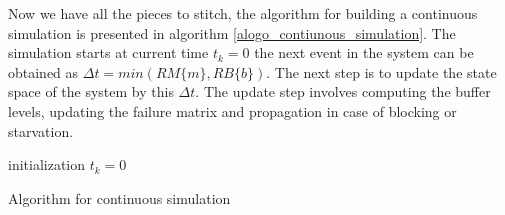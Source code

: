 Now we have all the pieces to stitch, the algorithm for building a continuous simulation is presented in algorithm \ref{alogo_contiunous_simulation}. The simulation starts at current time $t_{k} = 0$ the next event in the system can be obtained as $\Delta t = min(RM \lbrace m \rbrace, RB \lbrace b \rbrace)$. The next step is to update the state space of the system by this $\Delta t$. The update step involves computing the buffer levels, updating the failure matrix and propagation in case of blocking or starvation. 

\begin{algorithm}
    initialization\;
    $t_{k} = 0 $ \;
    \caption{Algorithm for continuous simulation}\label{alogo_contiunous_simulation}
\end{algorithm}